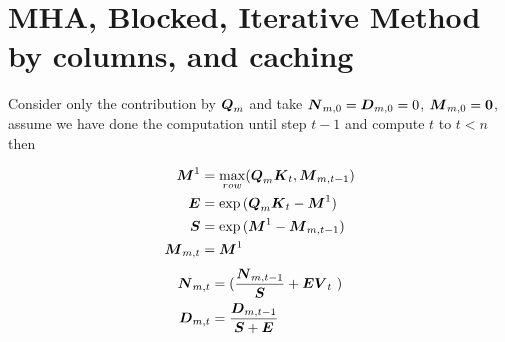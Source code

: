 \documentclass[journal]{IEEEtran}
\begin{document}
\begin{comment}
\begin{equation*}
  \Vc{r}_{0,t-1} =
  \frac{\sum_{j=0}^{t-1}(\exp{\Vc{Q}_0\Vc{K}_j})\Vc{V}_j}{\sum_{j=0}^{t-1}\exp{\Vc{Q}_0\Vc{K}_j}}
\end{equation*}
\begin{equation*}
  \Vc{r}_{t,n} = \frac{\sum_{j=t}^{n}(\exp{\Vc{Q}_0\Vc{K}_j})\Vc{V}_j}{\sum_{j=t}^n\exp{\Vc{Q}_0\Vc{K}_j}}
\end{equation*}

\begin{equation}
  \Vc{D}_{\iota,\ell} = \sum_{j=\iota}^{\ell}\exp{\Vc{Q}_0\Vc{K}_j}
\end{equation}
\begin{equation}
  \Vc{D}_{0,n} = \Vc{D}_{0,t-1} + \Vc{D}_{t,n}
\end{equation}

\begin{equation*}
  \Vc{R}_0 = \frac{\Vc{D}_{0,t-1}}{\Vc{D}_{0,t-1} + \Vc{D}_{t,n}}\Vc{r}_{0,t-1}  +  \frac{\Vc{D}_{t,n}}{\Vc{D}_{0,t-1} + \Vc{D}_{t,n}}\Vc{r}_{t,n} 
\end{equation*}
The fraction is actually a scalar operation: it is an element wise
scalar to be multiplied to $\Vc{r}_{0,i}$

\begin{equation*}
  \Vc{r}_{0,t+1} = \frac{\Vc{D}_{0,t-1}}{\Vc{D}_{0,t-1} + \Vc{D}_{t,t+1}}\Vc{r}_{0,t-1}  +  \frac{\Vc{D}_{t,t+1}}{\Vc{D}_{0,t-1} + \Vc{D}_{t,t+1}}\Vc{r}_{t,t+1} 
\end{equation*}

The Division does not need to be done step by step but only at the
end. So we have a matrix update iteration as in Equation \ref{eq:sum0}
and \ref{eq:sum1}, and we can conclude with the final result in
Equation \ref{eq:res} and \ref{eq:resall}.
\end{comment}


\section{MHA, Blocked, Iterative Method by columns, and caching}
\label{sec:iterative}
Consider only the contribution by ${\boldsymbol Q}_m$ and take ${\boldsymbol N}_{m,0}=
{\boldsymbol D}_{m,0}=0$, ${\boldsymbol M}_{m,0} = {\boldsymbol 0}$, assume we have done the
computation until step $t-1$ and compute $t$ to $t<n$ then

\begin{align*}
  {\boldsymbol M}^1  &= \max_{row}({\boldsymbol Q}_m{\boldsymbol K}_{t},{\boldsymbol M}_{m,t-1}) \\
  {\boldsymbol E}    & =\exp{({\boldsymbol Q}_m{\boldsymbol K}_{t}-{\boldsymbol M}^1)} \\
  {\boldsymbol S}    & =\exp{({\boldsymbol M}^1 - {\boldsymbol M}_{m,t-1})} \\
  {\boldsymbol M}_{m,t}   & ={\boldsymbol M}^1 \\
\end{align*}
\begin{align}
  \label{eq:sum0}
  \Vc{N}_{m,t}  &=( \frac{\Vc{N}_{m,t-1}}{\Vc{S}}  + \Vc{E}\Vc{V}_{t}\  ) \\
  \label{eq:sum1}
  \Vc{D}_{m,t} &= \frac{\Vc{D}_{m,t-1}}{\Vc{S} +\Vc{E}} 
\end{align}
\end{document}
